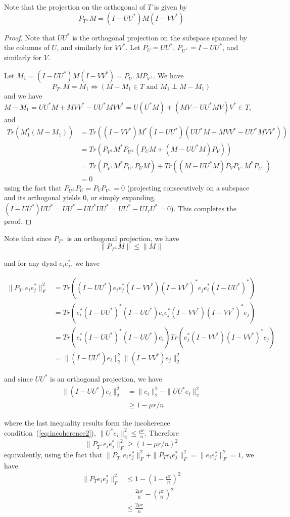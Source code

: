 Note that the projection on the orthogonal of $T$ is given by
\[
P_{T^\perp} M = (I - UU^*)M(I - VV^*)
\]

\begin{proof}
Note that $UU^*$ is the orthogonal projection on the subspace spanned by the columns of $U$, and similarly for $VV^*$. Let $P_U = UU^*$, $P_{U^\perp} = I - UU^*$, and similarly for $V$.

Let $M_1 = (I - UU^*)M(I - VV^*) = P_{U^\perp} M P_{V^\perp}$. We have 
\[
P_{T^\perp} M = M_1 \Leftrightarrow (M - M_1 \in T \text{ and } M_1 \perp M - M_1)
\]
and we have $M - M_1 = UU^*M + MVV^* - UU^*MVV^* = U(U^*M) + (MV - UU^*MV)V^* \in T$, and 
\begin{align*}
Tr(M_1^* (M - M_1))
&= Tr((I-VV^*)M^*(I-UU^*)(UU^*M + MVV^* - UU^*MVV^*)) \\
&= Tr(P_{V^\perp}M^*P_{U^\perp}(P_UM + (M - UU^*M)P_V)) \\
&= Tr(P_{V^\perp}M^*P_{U^\perp}P_UM) + Tr((M - UU^*M)P_VP_{V^\perp}M^*P_{U^\perp})\\
&=0
\end{align*}
using the fact that $P_{U^\perp}P_U = P_V P_{V^\perp} = 0$ (projecting consecutively on a subspace and its orthogonal yields 0, or simply expanding, $(I-UU^*)UU^* = UU^* - UU^*UU^* = UU^* - U I_r U^* = 0$). This completes the proof.
\end{proof}

Note that since $P_{T^\perp}$ is an orthogonal projection, we have
\[
\|P_{T^\perp} M \| \leq \|M\|
\]

and for any dyad $e_i e_j^*$, we have

\begin{align*}
\|P_{T^\perp} e_ie_j^*\|_F^2
&= Tr\left( (I-UU^*)e_ie_j^*(I-VV^*)(I-VV^*)^*e_je_i^*(I-UU^*)^* \right) \\
&= Tr\left( e_i^*(I-UU^*)^*(I-UU^*)e_ie_j^*(I-VV^*)(I-VV^*)^*e_j \right) \\
&= Tr\left( e_i^*(I-UU^*)^*(I-UU^*)e_i\right) Tr \left(e_j^*(I-VV^*)(I-VV^*)^*e_j \right) \\
&= \|(I - UU^*)e_i\|_2^2 \|(I - VV^*)e_j\|_2^2
\end{align*}

and since $UU^*$ is an orthogonal projection, we have
\begin{align*}
\|(I - UU^*)e_i\|_2^2 
&= \|e_i\|_2^2 - \|UU^*e_i\|_2^2 \\
&\geq 1 - \mu r / n
\end{align*}

where the last inequality results form the incoherence condition~(\ref{eq:incoherence2}), $\|U^*e_i\|_2^2 \leq \frac{\mu r}{n}$. Therefore 
\[
\|P_{T^\perp} e_ie_j^*\|_F^2 \geq (1 - \mu r / n)^2
\]
equivalently, using the fact that $\|P_{T^\perp} e_ie_j^*\|_F^2 + \|P_{T} e_ie_j^*\|_F^2 = \|e_ie_j^*\|_F^2 = 1$, we have
\begin{align*}
\|P_{T} e_ie_j^*\|_F^2 
&\leq 1 - (1 - \frac{\mu r}{n})^2 \\
&= \frac{2\mu r}{n} - \left( \frac{\mu r}{n} \right)^2 \\
&\leq \frac{2\mu r}{n}
\end{align*}


